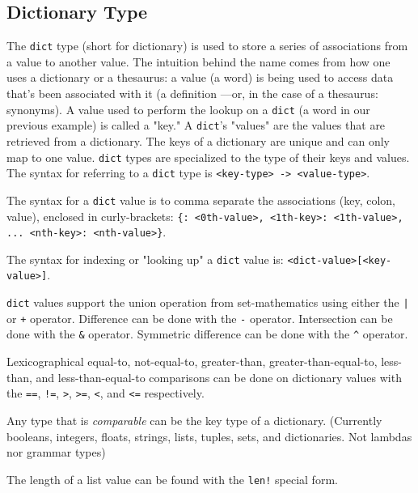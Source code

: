 
\subsection{Dictionary Type}
{
	The \texttt{dict} type (short for dictionary) is used to store
	a series of associations from a value to another value.
	The intuition behind the name comes from how one uses a dictionary or a
	thesaurus: a value (a word) is being used to access data that's been
	associated with it (a definition ---or, in the case of a thesaurus: synonyms).
	A value used to perform the lookup on a \texttt{dict} (a word in our
	previous example) is called a "key." A \texttt{dict}'s "values" are the
	values that are retrieved from a dictionary.
	The keys of a dictionary are unique and can only map to one value.
	\texttt{dict} types are specialized to the type of their keys and values.
	The syntax for referring to a \texttt{dict} type
	is \texttt{<key-type> -> <value-type>}.
	
	The syntax for a \texttt{dict} value is to comma
	separate the associations (key, colon, value), enclosed in
	curly-brackets: \texttt{\{<0th-key>: <0th-value>, <1th-key>: <1th-value>, ... <nth-key>: <nth-value>\}}.
	
	The syntax for indexing or "looking up" a \texttt{dict} value
	is: \texttt{<dict-value>[<key-value>]}.
	
	\texttt{dict} values support the union operation from set-mathematics using
	either the \texttt{|} or \texttt{+} operator. 
	Difference can be done with the \texttt{-} operator.
	Intersection can be done with the \texttt{\&} operator.
	Symmetric difference can be done with the \texttt{\^} operator.
	
	Lexicographical equal-to, not-equal-to, greater-than, greater-than-equal-to,
	less-than, and less-than-equal-to comparisons
	can be done on dictionary values with
	the \texttt{==}, \texttt{!=},
	\texttt{>}, \texttt{>=}, \texttt{<}, and \texttt{<=} respectively.
	
	Any type that is \textit{comparable} can be the key type of a dictionary.
	(Currently booleans, integers, floats, strings, lists, tuples,
		sets, and dictionaries. Not lambdas nor grammar types)
		
	The length of a list value can be found with the \texttt{len!} special form.
}











